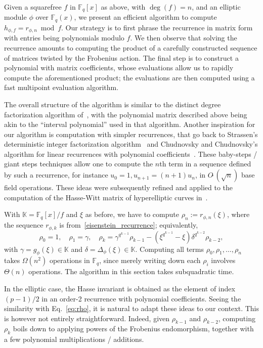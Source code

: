 \documentclass[12pt]{article}
\theoremstyle{plain}
\theoremstyle{definition}
\newcommand{\tildO}{O\tilde{~}}
\def\F{\ensuremath{\mathbb{F}}}
\def\K{\ensuremath{\mathbb{K}}}
\begin{document}
Given a squarefree $f$ in $\F_q[x]$ as above, with $\deg(f)=n$, and an
elliptic module $\phi$ over $\F_q(x)$, we present an efficient
algorithm to compute $h_{\phi,f} = r_{\phi,n} \bmod f$.  Our strategy
is to first phrase the recurrence in matrix form with entries being
polynomials modulo $f$. We then observe that solving the recurrence
amounts to computing the product of a carefully constructed sequence
of matrices twisted by the Frobenius action. The final step is to
construct a polynomial with matrix coefficients, whose evaluations
allow us to rapidly compute the aforementioned product; the evaluations
are then computed using a fast multipoint evaluation algorithm. 

The overall structure of the algorithm is similar to the distinct
degree factorization algorithm of~\cite{ks}, with the polynomial
matrix described above being akin to the ``interval polynomial'' used
in that algorithm.  Another inspiration for our algorithm is
computation with simpler recurrences, that go back to Strassen's
deterministic integer factorization algorithm~\cite{Strassen76} and
Chudnovsky and Chudnovsky's algorithm for linear recurrences with
polynomial coefficients~\cite{ChCh88}. These baby-steps / giant steps
techniques allow one to compute the $n$th term in a sequence defined
by such a recurrence, for instance $u_0=1, u_{n+1}=(n+1) u_n$, in
$\tildO(\sqrt{n})$ base field operations. These ideas were
subsequently refined and applied to the computation of the Hasse-Witt
matrix of hyperelliptic curves in~\cite{BoGaSc07}.


With $\K = \F_q[x]/f$ and $\xi$ as before, we have to compute $\rho_n:=
r_{\phi,n}(\xi)$, where the sequence $r_{\phi,k}$ is
from~\eqref{eisenstein_recurrence}; equivalently,
\begin{equation}\label{eq:rho}
  \rho_0=1,\quad \rho_1=\gamma,\quad
\rho_{k} = \gamma^{q^{k-1}}\rho_{k-1} -
(\xi^{q^{k-1}}-\xi)\delta^{q^{k-2}} \rho_{k-2},
\end{equation}
with $\gamma = g_\phi(\xi)\in \K$ and $\delta=\Delta_\phi(\xi) \in \K$.
Computing all terms $\rho_0,\rho_1,\dots,\rho_n$ takes $\Omega(n^2)$
operations in $\F_q$, since merely writing down each $\rho_i$ involves
$\Theta(n)$ operations. The algorithm in this section takes
subquadratic time.

In the elliptic case, the Hasse invariant is obtained as the element
of index $(p-1)/2$ in an order-2 recurrence with polynomial
coefficients. Seeing the similarity with Eq.~\eqref{eq:rho}, it is
natural to adapt these ideas to our context. This is however not
entirely straightforward.  Indeed, given $\rho_{k-1}$ and
$\rho_{k-2}$, computing $\rho_k$  boils down to applying powers
of the Frobenius endomorphism, together with a few polynomial
multiplications / additions.  
\end{document}
